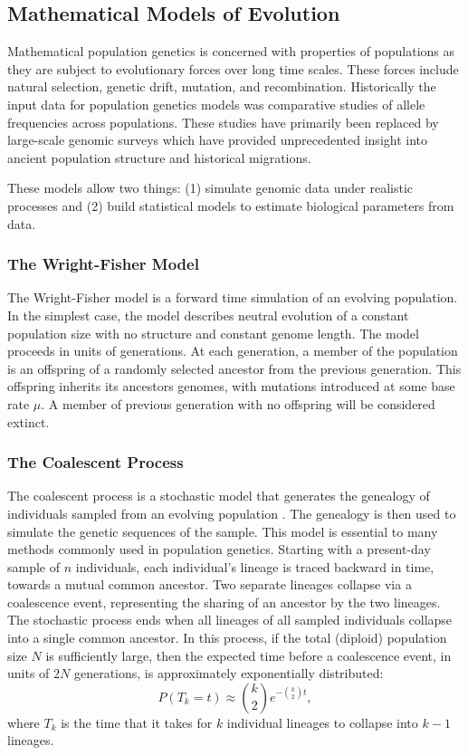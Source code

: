 \subsection{Mathematical Models of Evolution}
\label{bg:bio:models}

Mathematical population genetics is concerned with properties of populations as they are subject to evolutionary forces over long time scales.
These forces include natural selection, genetic drift, mutation, and recombination.
Historically the input data for population genetics models was comparative studies of allele frequencies across populations.
These studies have primarily been replaced by large-scale genomic surveys which have provided unprecedented insight into ancient population structure and historical migrations.

These models allow two things: (1) simulate genomic data under realistic processes and (2) build statistical models to estimate biological parameters from data.

\subsubsection{The Wright-Fisher Model}
\label{bg:bio:models:wrightfisher}

The Wright-Fisher model is a forward time simulation of an evolving population.
In the simplest case, the model describes neutral evolution of a constant population size with no structure and constant genome length.
The model proceeds in units of generations.
At each generation, a member of the population is an offspring of a randomly selected ancestor from the previous generation.
This offspring inherits its ancestors genomes, with mutations introduced at some base rate $\mu$.
A member of previous generation with no offspring will be considered extinct.

\subsubsection{The Coalescent Process}
\label{bg:bio:models:coalescent}

The coalescent process is a stochastic model that generates the genealogy of individuals sampled from an evolving population \cite{Wakeley:2009}.
The genealogy is then used to simulate the genetic sequences of the sample.
This model is essential to many methods commonly used in population genetics.
Starting with a present-day sample of $n$ individuals, each individual's lineage is traced backward in time, towards a mutual common ancestor.
Two separate lineages collapse via a coalescence event, representing the sharing of an ancestor by the two lineages.
The stochastic process ends when all lineages of all sampled individuals collapse into a single common ancestor.
In this process, if the total (diploid) population size $N$ is sufficiently large, then the expected time before a coalescence event, in units of $2N$ generations, is approximately exponentially distributed:
\begin{equation}
P(T_{k}=t) \approx \binom{k}{2} e^{-\binom{k}{2} t},
\end{equation}
where $T_k$ is the time that it takes for $k$ individual lineages to collapse into $k-1$ lineages.

